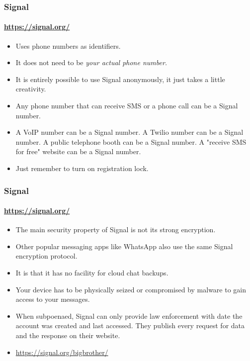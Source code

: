 \documentclass[aspectratio=169,usenames,dvipsnames]{beamer}
\begin{document}
\begin{frame}
  \frametitle{Signal}
  \framesubtitle{\url{https://signal.org/}}

  \begin{itemize}[<+->]
    \item Uses phone numbers as identifiers.
    \item It does not need to be \emph{your actual phone number.}
    \item It is entirely possible to use Signal anonymously, it just takes a
      little creativity.
    \item Any phone number that can receive SMS or a phone call can be a
      Signal number.
    \item A VoIP number can be a Signal number. A Twilio number can be a
      Signal number. A public telephone booth can be a Signal number.
      A "receive SMS for free" website can be a Signal number.
    \item Just remember to turn on registration lock.
  \end{itemize}
\end{frame}

\begin{frame}
  \frametitle{Signal}
  \framesubtitle{\url{https://signal.org/}}

  \begin{itemize}[<+->]
    \item The main security property of Signal is not its strong encryption.
    \item Other popular messaging apps like WhatsApp also use the same Signal
      encryption protocol.
    \item It is that it has no facility for cloud chat backups.
    \item Your device has to be physically seized or compromised by malware to
      gain access to your messages.
    \item When subpoenaed, Signal can only provide law enforcement with date
      the account was created and last accessed. They publish every request
      for data and the response on their website.
    \item \url{https://signal.org/bigbrother/}
  \end{itemize}
\end{frame}
\end{document}
